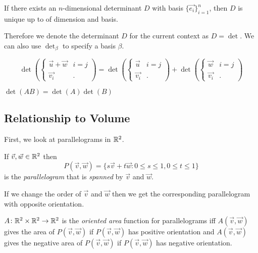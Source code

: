 \documentclass[notes]{subfiles}
\begin{document}
\begin{lemma}
    If there exists an $n$-dimensional determinant $D$ with basis $\{ \vec{e_i} \}_{i = 1}^n$, then $D$ is unique up to of dimension and basis.
\end{lemma}

Therefore we denote the determinant $D$ for the current context as $D = \det$. We can also use $\det_\beta$ to specify a basis $\beta$.

\begin{theorem} \label{det_additive}
    \[
        \det\left( \begin{cases}
            \vec{u} + \vec{w} & i = j \\
            \vec{v_i} & .
        \end{cases} \right)
        =
        \det\left( \begin{cases}
            \vec{u} & i = j \\
            \vec{v_i} & .
        \end{cases} \right)
        +
        \det\left( \begin{cases}
            \vec{w} & i = j \\
            \vec{v_i} & .
        \end{cases} \right)
    \]
\end{theorem}

\begin{lemma}
    $\det(AB) = \det(A)\det(B)$
\end{lemma}

\subsection{Relationship to Volume}
First, we look at parallelograms in $\mathbb{R}^2$.

\begin{definition}[Parallelogram]
    If $\vec{v}, \vec{w} \in \mathbb{R}^2$ then
    \[
        P(\vec{v}, \vec{w}) = \{ s\vec{v} + t\vec{w} : 0 \leq s \leq 1, 0 \leq t \leq 1 \}
    \]
    is the \textit{parallelogram} that is \textit{spanned} by $\vec{v}$ and $\vec{w}$.
\end{definition}

If we change the order of $\vec{v}$ and $\vec{w}$ then we get the corresponding parallelogram with opposite orientation.

\begin{definition}
    $A\colon \mathbb{R}^2 \times \mathbb{R}^2 \to \mathbb{R}^2$ is the \textit{oriented area} function for parallelograms iff $A(\vec{v}, \vec{w})$ gives the area of $P(\vec{v}, \vec{w})$ if $P(\vec{v}, \vec{w})$ has positive orientation and $A(\vec{v}, \vec{w})$ gives the negative area of $P(\vec{v}, \vec{w})$ if $P(\vec{v}, \vec{w})$ has negative orientation.
\end{definition}
\end{document}
